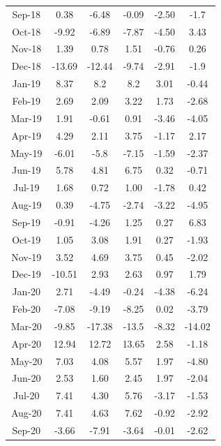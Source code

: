 \documentclass[UTF8]{ctexart}
\begin{document}
\begin{appendices}
{\begin{longtable}[c]{cccccc}
    Sep-18 & 0.38      & -6.48     & -0.09  & -2.50 & -1.7      \\
    Oct-18 & -9.92     & -6.89     & -7.87  & -4.50 & 3.43      \\
    Nov-18 & 1.39      & 0.78      & 1.51   & -0.76 & 0.26      \\
    Dec-18 & -13.69    & -12.44    & -9.74  & -2.91 & -1.9      \\
    Jan-19 & 8.37      & 8.2       & 8.2    & 3.01  & -0.44     \\
    Feb-19 & 2.69      & 2.09      & 3.22   & 1.73  & -2.68     \\
    Mar-19 & 1.91      & -0.61     & 0.91   & -3.46 & -4.05     \\
    Apr-19 & 4.29      & 2.11      & 3.75   & -1.17 & 2.17      \\
    May-19 & -6.01     & -5.8      & -7.15  & -1.59 & -2.37     \\
    Jun-19 & 5.78      & 4.81      & 6.75   & 0.32  & -0.71     \\
    Jul-19 & 1.68      & 0.72      & 1.00   & -1.78 & 0.42      \\
    Aug-19 & 0.39      & -4.75     & -2.74  & -3.22 & -4.95     \\
    Sep-19 & -0.91     & -4.26     & 1.25   & 0.27  & 6.83      \\
    Oct-19 & 1.05      & 3.08      & 1.91   & 0.27  & -1.93     \\
    Nov-19 & 3.52      & 4.69      & 3.75   & 0.45  & -2.02     \\
    Dec-19 & -10.51    & 2.93      & 2.63   & 0.97  & 1.79      \\
    Jan-20 & 2.71      & -4.49     & -0.24  & -4.38 & -6.24     \\
    Feb-20 & -7.08     & -9.19     & -8.25  & 0.02  & -3.79     \\
    Mar-20 & -9.85     & -17.38    & -13.5  & -8.32 & -14.02    \\
    Apr-20 & 12.94     & 12.72     & 13.65  & 2.58  & -1.18     \\
    May-20 & 7.03      & 4.08      & 5.57   & 1.97  & -4.80     \\
    Jun-20 & 2.53      & 1.60      & 2.45   & 1.97  & -2.04     \\
    Jul-20 & 7.41      & 4.30      & 5.76   & -3.17 & -1.53     \\
    Aug-20 & 7.41      & 4.63      & 7.62   & -0.92 & -2.92     \\
    Sep-20 & -3.66     & -7.91     & -3.64  & -0.01 & -2.62     \\

\end{longtable}}
\end{appendices}
\end{document}
